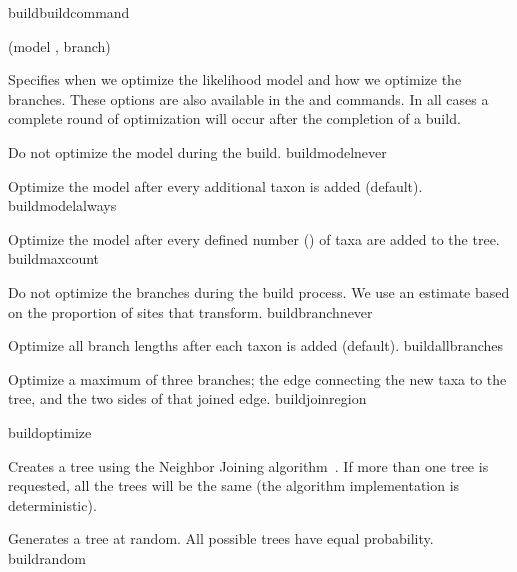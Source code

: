 \begin{command}{build}{buildcommand}
\begin{arguments}
 
         {(model \optional {\poylident}, branch\optional {\poylident})}
            {Specifies when we optimize the likelihood model and how we optimize
            the branches. These options are also available in the
             and  commands. In all cases a
            complete round of optimization will occur after the completion of a
            build.

            \begin{description}

                    {Do not optimize the model during the build.}
                    {buildmodelnever}

                    {Optimize the model after every additional taxon is added (default).}
                    {buildmodelalways}

                    {Optimize the model after every defined number (\poyint) of taxa are added to the tree.}
                    {buildmaxcount}
                    
                    {Do not optimize the branches during the build process. We use
                    an estimate based on the proportion of sites that transform.}
                    {buildbranchnever}

                    {Optimize all branch lengths after each taxon is added (default).}
                    {buildallbranches}

                    {Optimize a maximum of three branches; the edge connecting
                    the new taxa to the tree, and the two sides of that joined
                    edge.}
                    {buildjoinregion}

            \end{description}
            }
            {buildoptimize}

            {Creates a tree using the Neighbor Joining algorithm~\cite{saitou1987}. If more than
            one tree is requested, all the trees will be the same (the algorithm
            implementation is deterministic).}{}

            {Generates a tree at random. All possible trees have equal probability.}
            {buildrandom}


\end{arguments}
\end{command}
